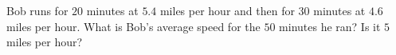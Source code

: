 Bob runs for $20$ minutes at $5.4$ miles per hour and then for $30$ minutes at $4.6$ miles per hour. What is Bob's average speed for the $50$ minutes he ran? Is it $5$ miles per hour?
